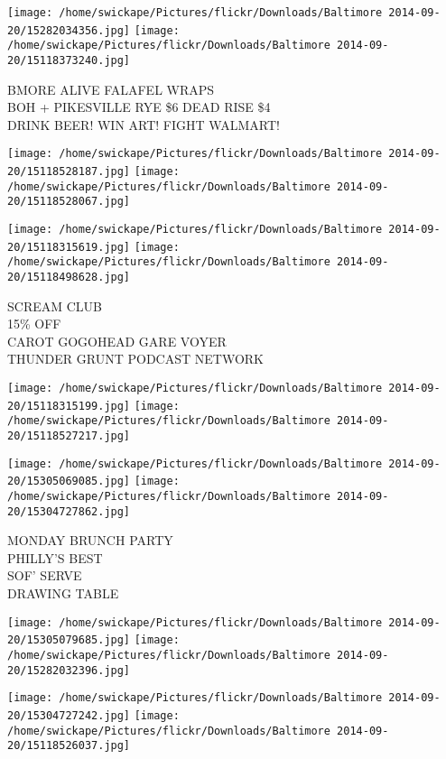 \documentclass[10pt,letterpaper]{article}
\begin{document}
\vspace{0.25in}
\texttt{[image: /home/swickape/Pictures/flickr/Downloads/Baltimore 2014-09-20/15282034356.jpg]}
\texttt{[image: /home/swickape/Pictures/flickr/Downloads/Baltimore 2014-09-20/15118373240.jpg]}

BMORE ALIVE FALAFEL WRAPS\\
BOH + PIKESVILLE RYE \$6 DEAD RISE \$4\\
DRINK BEER! WIN ART! FIGHT WALMART!
\pagebreak

\texttt{[image: /home/swickape/Pictures/flickr/Downloads/Baltimore 2014-09-20/15118528187.jpg]}
\texttt{[image: /home/swickape/Pictures/flickr/Downloads/Baltimore 2014-09-20/15118528067.jpg]}

\texttt{[image: /home/swickape/Pictures/flickr/Downloads/Baltimore 2014-09-20/15118315619.jpg]}
\texttt{[image: /home/swickape/Pictures/flickr/Downloads/Baltimore 2014-09-20/15118498628.jpg]}

SCREAM CLUB\\
15\% OFF\\
CAROT GOGOHEAD GARE VOYER\\
THUNDER GRUNT PODCAST NETWORK
\pagebreak

\texttt{[image: /home/swickape/Pictures/flickr/Downloads/Baltimore 2014-09-20/15118315199.jpg]}
\texttt{[image: /home/swickape/Pictures/flickr/Downloads/Baltimore 2014-09-20/15118527217.jpg]}

\texttt{[image: /home/swickape/Pictures/flickr/Downloads/Baltimore 2014-09-20/15305069085.jpg]}
\texttt{[image: /home/swickape/Pictures/flickr/Downloads/Baltimore 2014-09-20/15304727862.jpg]}

MONDAY BRUNCH PARTY\\
PHILLY'S BEST\\
SOF' SERVE\\
DRAWING TABLE
\pagebreak

\texttt{[image: /home/swickape/Pictures/flickr/Downloads/Baltimore 2014-09-20/15305079685.jpg]}
\texttt{[image: /home/swickape/Pictures/flickr/Downloads/Baltimore 2014-09-20/15282032396.jpg]}

\texttt{[image: /home/swickape/Pictures/flickr/Downloads/Baltimore 2014-09-20/15304727242.jpg]}
\texttt{[image: /home/swickape/Pictures/flickr/Downloads/Baltimore 2014-09-20/15118526037.jpg]}
\end{document}
